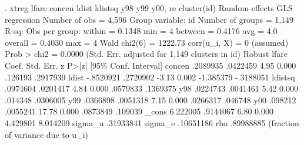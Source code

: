 . xtreg lfare concen ldist ldistsq y98 y99 y00, re cluster(id)
{\smallskip}
Random-effects GLS regression                   Number of obs     =      4,596
Group variable: id                              Number of groups  =      1,149
{\smallskip}
R-sq:                                           Obs per group:
     within  = 0.1348                                         min =          4
     between = 0.4176                                         avg =        4.0
     overall = 0.4030                                         max =          4
{\smallskip}
                                                Wald chi2(6)      =    1222.73
corr(u_i, X)   = 0 (assumed)                    Prob > chi2       =     0.0000
{\smallskip}
                                 (Std. Err. adjusted for 1,149 clusters in id)
             {\VBAR}               Robust
       lfare {\VBAR}      Coef.   Std. Err.      z    P>|z|     [95\% Conf. Interval]
      concen {\VBAR}   .2089935   .0422459     4.95   0.000      .126193    .2917939
       ldist {\VBAR}  -.8520921   .2720902    -3.13   0.002    -1.385379   -.3188051
     ldistsq {\VBAR}   .0974604   .0201417     4.84   0.000     .0579833    .1369375
         y98 {\VBAR}   .0224743   .0041461     5.42   0.000      .014348    .0306005
         y99 {\VBAR}   .0366898   .0051318     7.15   0.000     .0266317     .046748
         y00 {\VBAR}    .098212   .0055241    17.78   0.000     .0873849     .109039
       _cons {\VBAR}   6.222005   .9144067     6.80   0.000     4.429801    8.014209
     sigma_u {\VBAR}  .31933841
     sigma_e {\VBAR}  .10651186
         rho {\VBAR}  .89988885   (fraction of variance due to u_i)
{\smallskip}

